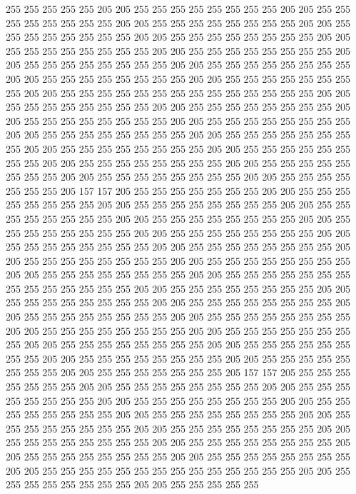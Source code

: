 255 255 255 255 255 205 205 255 255 255 255 255 255 255 255 205 205 255 255 255
255 255 255 255 255 205 205 255 255 255 255 255 255 255 255 205 205 255 255 255
255 255 255 255 255 205 205 255 255 255 255 255 255 255 255 205 205 255 255 255
255 255 255 255 255 205 205 255 255 255 255 255 255 255 255 205 205 255 255 255
255 255 255 255 255 205 205 255 255 255 255 255 255 255 255 205 205 255 255 255
255 255 255 255 255 205 205 255 255 255 255 255 255 255 255 205 205 255 255 255
255 255 255 255 255 255 255 255 255 255 255 205 205 255 255 255 255 255 255 255
255 205 205 255 255 255 255 255 255 255 255 205 205 255 255 255 255 255 255 255
255 205 205 255 255 255 255 255 255 255 255 205 205 255 255 255 255 255 255 255
255 205 205 255 255 255 255 255 255 255 255 205 205 255 255 255 255 255 255 255
255 205 205 255 255 255 255 255 255 255 255 205 205 255 255 255 255 255 255 255
255 205 205 255 255 255 255 255 255 255 255 205 205 255 255 255 255 255 255 255
255 205 205 255 255 255 255 255 255 255 205 157 157 205 255 255 255 255 255 255
255 205 205 255 255 255 255 255 255 255 255 205 205 255 255 255 255 255 255 255
255 205 205 255 255 255 255 255 255 255 255 205 205 255 255 255 255 255 255 255
255 205 205 255 255 255 255 255 255 255 255 205 205 255 255 255 255 255 255 255
255 205 205 255 255 255 255 255 255 255 255 205 205 255 255 255 255 255 255 255
255 205 205 255 255 255 255 255 255 255 255 205 205 255 255 255 255 255 255 255
255 205 205 255 255 255 255 255 255 255 255 205 205 255 255 255 255 255 255 255
255 255 255 255 255 255 255 205 205 255 255 255 255 255 255 255 255 205 205 255
255 255 255 255 255 255 255 205 205 255 255 255 255 255 255 255 255 205 205 255
255 255 255 255 255 255 255 205 205 255 255 255 255 255 255 255 255 205 205 255
255 255 255 255 255 255 255 205 205 255 255 255 255 255 255 255 255 205 205 255
255 255 255 255 255 255 255 205 205 255 255 255 255 255 255 255 255 205 205 255
255 255 255 255 255 255 255 205 205 255 255 255 255 255 255 255 255 205 205 255
255 255 255 255 255 255 205 157 157 205 255 255 255 255 255 255 255 205 205 255
255 255 255 255 255 255 255 205 205 255 255 255 255 255 255 255 255 205 205 255
255 255 255 255 255 255 255 205 205 255 255 255 255 255 255 255 255 205 205 255
255 255 255 255 255 255 255 205 205 255 255 255 255 255 255 255 255 205 205 255
255 255 255 255 255 255 255 205 205 255 255 255 255 255 255 255 255 205 205 255
255 255 255 255 255 255 255 205 205 255 255 255 255 255 255 255 255 205 205 255
255 255 255 255 255 255 255 205 205 255 255 255 255 255 255 255 255 255 255 255
255 255 255 205 205 255 255 255 255 255 255 255 255 205 205 255 255 255 255 255
